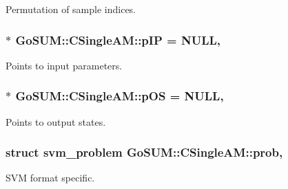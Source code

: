 Permutation of sample indices. 

\hypertarget{class_go_s_u_m_1_1_c_single_a_m_a0816476bc95532d1ba3e1f9198ac9d09}{
\subsubsection[{p\-I\-P}]{ $\ast$ Go\-S\-U\-M\-::\-C\-Single\-A\-M\-::p\-I\-P = {\bf N\-U\-L\-L}\hspace{0.3cm}{\ttfamily [static]}, {\ttfamily [protected]}}}\label{class_go_s_u_m_1_1_c_single_a_m_a0816476bc95532d1ba3e1f9198ac9d09}


Points to input parameters. 

\hypertarget{class_go_s_u_m_1_1_c_single_a_m_adb33dda815cdb845accba4ea8c7a0d61}{
\subsubsection[{p\-O\-S}]{ $\ast$ Go\-S\-U\-M\-::\-C\-Single\-A\-M\-::p\-O\-S = {\bf N\-U\-L\-L}\hspace{0.3cm}{\ttfamily [static]}, {\ttfamily [protected]}}}\label{class_go_s_u_m_1_1_c_single_a_m_adb33dda815cdb845accba4ea8c7a0d61}


Points to output states. 

\hypertarget{class_go_s_u_m_1_1_c_single_a_m_a85d854a5ad2d7c574f8f2ab689de6418}{
\subsubsection[{prob}]{\setlength{\rightskip}{0pt plus 5cm}struct svm\-\_\-problem Go\-S\-U\-M\-::\-C\-Single\-A\-M\-::prob\hspace{0.3cm}{\ttfamily [static]}, {\ttfamily [protected]}}}\label{class_go_s_u_m_1_1_c_single_a_m_a85d854a5ad2d7c574f8f2ab689de6418}


S\-V\-M format specific. 

